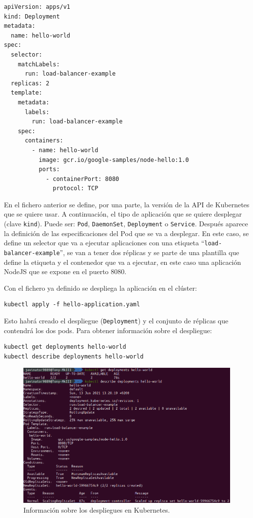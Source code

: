 \begin{lstlisting}[style=kubernetes, caption={Configuración de una aplicación ``Hello World'' en Kubernetes.}, label={lst:kubernetes}]
apiVersion: apps/v1
kind: Deployment
metadata:
  name: hello-world
spec:
  selector:
    matchLabels:
      run: load-balancer-example
  replicas: 2
  template:
    metadata:
      labels:
        run: load-balancer-example
    spec:
      containers:
        - name: hello-world
          image: gcr.io/google-samples/node-hello:1.0
          ports:
            - containerPort: 8080
              protocol: TCP
\end{lstlisting}

En el fichero anterior se define, por una parte, la versión de la API de Kubernetes
que se quiere usar. A continuación, el tipo de aplicación que se quiere desplegar
(clave \texttt{kind}). Puede ser: \texttt{Pod}, \texttt{DaemonSet}, \texttt{Deployment}
o \texttt{Service}. Después aparece la definición de las especificaciones del
Pod que se va a desplegar. En este caso, se define un selector que va a ejecutar 
aplicaciones con una etiqueta ``\texttt{load-balancer-example}'', se van a tener
dos réplicas y se parte de una plantilla que define la etiqueta y el contenedor que
va a ejecutar, en este caso una aplicación NodeJS que se expone en el puerto 8080.

Con el fichero ya definido se despliega la aplicación en el clúster:

\begin{lstlisting}[style=bash, caption={}]
kubectl apply -f hello-application.yaml
\end{lstlisting}

Esto habrá creado el despliegue (\texttt{Deployment}) y el conjunto de réplicas que
contendrá los dos pods. Para obtener información sobre el despliegue:

\begin{lstlisting}[style=bash, caption={}]
kubectl get deployments hello-world
kubectl describe deployments hello-world
\end{lstlisting}

\begin{figure}[H]
    \centering
    \includegraphics[width=.9\linewidth]{pictures/kubectl-deployments.png}
    \caption{Información sobre los despliegues en Kubernetes.}
    \label{fig:deployments}
\end{figure}

